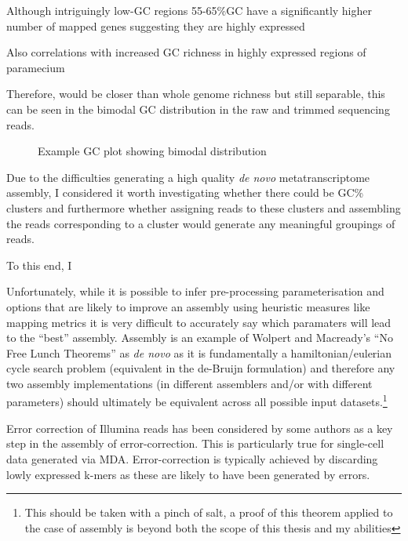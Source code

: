 Although intriguingly low-GC regions 55-65\%GC have a significantly higher number of mapped genes suggesting they are highly expressed \citep{Blanc2010}

Also correlations with increased GC richness in highly expressed regions of paramecium

Therefore,  would be closer than whole genome richness but still separable, this can be seen in the bimodal GC distribution in the raw and trimmed sequencing 
reads.

\begin{figure}
    Example GC plot showing bimodal distribution
\end{figure}

Due to the difficulties generating a high quality \textit{de novo} metatranscriptome assembly, I considered  it worth investigating whether there could be GC\%
clusters and furthermore whether assigning reads to these clusters and assembling the reads corresponding to a cluster would generate any meaningful groupings of reads.

To this end, I 






Unfortunately, while it is possible to infer pre-processing parameterisation and options that
are likely to improve an assembly using heuristic measures like mapping metrics
it is very difficult to accurately say which paramaters 
will lead to the ``best'' assembly.  Assembly is an example of
Wolpert and Macready's ``No Free Lunch Theorems'' \citep{Wolpert1995,Wolpert1997} 
as \textit{de novo} as it is fundamentally a hamiltonian/eulerian cycle search problem (equivalent
    in the de-Bruijn formulation) and therefore any two assembly implementations (in different assemblers and/or
    with different parameters) should ultimately be equivalent across all possible input datasets.\footnote{
    This should be taken with a pinch of salt, a proof of this theorem applied to the case of assembly is beyond
both the scope of this thesis and my abilities}





Error correction of Illumina reads has been considered by some authors as a key
step in the assembly of error-correction.  This is particularly true for single-cell
data generated via MDA. 
Error-correction is typically achieved by discarding lowly expressed k-mers 
as these are likely to have been generated by errors.









